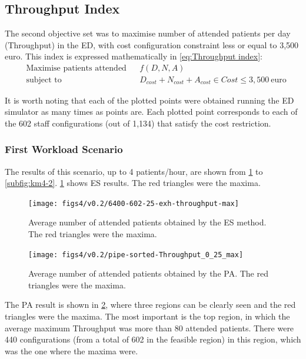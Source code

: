 \subsection{Throughput Index}

The second objective set was to maximise number of attended patients
per day (Throughput) in the ED, with cost configuration constraint
less or equal to 3,500 euro. This index is expressed mathematically in
\ref{eq:Throughput index}:\vspace*{-0.125cm}
\begin{equation}
\begin{aligned} & {\text{Maximise patients attended}} &  & f(D,N,A)\\
 & \text{subject to} &  & D_{cost}+N_{cost}+A_{cost}\in Cost\leq3,500\:\text{euro}
\end{aligned}
\label{eq:Throughput index}
\end{equation}


It is worth noting that each of the plotted points were obtained running
the ED simulator as many times as points are. Each plotted point corresponds
to each of the 602 staff configurations (out of 1,134) that satisfy
the cost restriction.


\subsubsection{First Workload Scenario}

The results of this scenario, up to 4 patients/hour, are shown from
\ref{subfig:es4-2} to \ref{subfig:km4-2}. \ref{subfig:es4-2} shows
ES results. The red triangles were the maxima.
\begin{figure}[H]
\centering{}\vspace*{-0.2cm}\texttt{[image: figs4/v0.2/6400-602-25-exh-throughput-max]}\caption{Average number of attended patients obtained by the ES method. The
red triangles were the maxima. \label{subfig:es4-2}}
\end{figure}
 \vspace*{-0.2cm}

\begin{figure}[H]
\centering{}\vspace*{-0.2cm}\texttt{[image: figs4/v0.2/pipe-sorted-Throughput\_0\_25\_max]}\caption{Average number of attended patients obtained by the PA. The red triangles
were the maxima. \label{subfig:pipe4-2}}
\end{figure}
 The PA result is shown in \ref{subfig:pipe4-2}, where three regions
can be clearly seen and the red triangles were the maxima. The most
important is the top region, in which the average maximum Throughput
was more than 80 attended patients. There were 440 configurations
(from a total of 602 in the feasible region) in this region, which
was the one where the maxima were.

